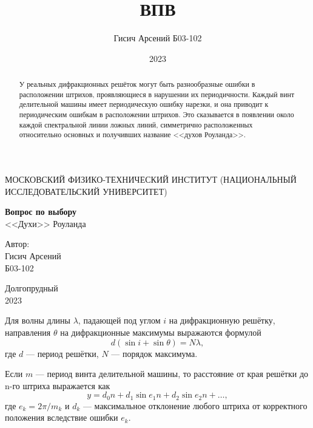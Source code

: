 \documentclass[a4paper, 12pt]{article}
\title{ВПВ}
\author{Гисич Арсений Б03-102}
\date{2023}
\begin{document}
	\begin{center}
		{\large МОСКОВСКИЙ ФИЗИКО-ТЕХНИЧЕСКИЙ ИНСТИТУТ (НАЦИОНАЛЬНЫЙ ИССЛЕДОВАТЕЛЬСКИЙ УНИВЕРСИТЕТ)}
	\end{center}
	\vspace{5 cm}
	{\Large
		\begin{center}
			{\bf Вопрос по выбору}\\[0.2 cm]
			<<Духи>> Роуланда
		\end{center}
	}
	\vspace{4 cm}
	\begin{flushright}
		{\Large Автор: \\
			\vspace{0.2 cm}
			Гисич Арсений \\
			\vspace{0.2 cm}
			Б03-102 \\}
	\end{flushright}
	\vspace{8 cm}
	\begin{center}
		Долгопрудный\\[0.1 cm]
		2023
	\end{center}
\thispagestyle{empty}

\begin{abstract}
У реальных дифракционных решёток могут быть разнообразные ошибки в расположении штрихов, проявляющиеся в нарушении их периодичности. Каждый винт делительной машины имеет периодическую ошибку нарезки, и она приводит к периодическим ошибкам в расположении штрихов. Это сказывается в появлении около каждой спектральной линии ложных линий, симметрично расположенных относительно основных и получивших название <<духов Роуланда>>.
\end{abstract}

Для волны длины $\lambda$, падающей под углом $i$ на дифракционную решётку, направления $\theta$ на дифракционные максимумы выражаются формулой 
\begin{equation} \label{eq:dif_grating}
d (\sin{i} + \sin{\theta}) = N \lambda,
\end{equation}
где $d$ --- период решётки, $N$ --- порядок максимума.

Если $m$ --- период винта делительной машины, то расстояние от края решётки до n-го штриха выражается как
\begin{equation} \label{eq:err_pos}
y = d_0 n + d_1 \sin{e_1 n} + d_2 \sin{e_2 n} + \ldots,
\end{equation}
где $e_k = 2\pi/m_k$ и $d_k$ --- максимальное отклонение любого штриха от корректного положения вследствие ошибки $e_k$.
\end{document}
